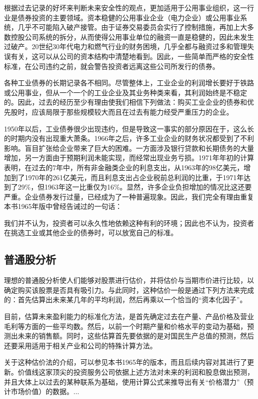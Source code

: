 \documentclass[12pt,oneside]{book}
\begin{document}
根据过去记录的好坏来判断未来安全性的观点，更加适用于公用事业组织，这一行业是债券投资的主要领域。资本稳健的公用事业企业（电力企业）或公用事业系统，几乎不可能陷入破产接管。由于证券交易委员会实行了控制措施，再加上大多数控股公司系统的拆分，从而使得公用事业单位的融资一直是稳健的，因此未发生过破产。20世纪30年代电力和燃气行业的财务困境，几乎全都与融资过多和管理失误有关，这可以从公司的资本结构中清楚地看到。因此，一些简单而严格的安全性标准，在公司违约之前，就会警告投资者远离这些公司所发行的债券。

各种工业债券的长期记录各不相同。尽管整体上，工业企业的利润增长要好于铁路或公用事业，但从一个一个的工业企业及其业务种类来看，其利润始终是不稳定的。因此，过去的经历至少有理由使我们相信下列做法：购买工业企业的债券和优先股时，应该局限于那些规模较大而且在过去有能力经受严重压力的企业。

1950年以后，工业债券很少出现违约，但是导致这一事实的部分原因在于，这么长的时期内没有出现重大萧条。1966年之后，许多工业企业的财务状况都受到了不利影响。盲目扩张给企业带来了巨大的困难。一方面涉及银行贷款和长期债务的大量增加，另一方面由于预期利润未能实现，而经常出现业务亏损。1971年年初的计算表明，在过去的7年中，所有非金融类企业的利息支出，从1963年的98亿美元，增加到了1970年的261亿美元，而且利息支出占企业税前总利润的比重，于1971年达到了29\%，但1963年这一比重仅为16\%。显然，许多企业负担增加的情况比这还要严重。企业债券发行过量，已经成为了一种普遍现象。因此，我们完全有理由重复本书1965年版中曾经告诫过的一句话：

我们并不认为，投资者可以永久性地依赖这种有利的环境；因此也不认为，投资者在挑选工业或其他企业的债券时，可以放宽自己的标准。

\subsection{普通股分析}
理想的普通股分析使人们能够对股票进行估价，并将估价与当期市价进行比较，以确定购买该股票是否具有吸引力。与此同时，这种估价一般是通过下列方法来完成的：首先估算出未来某几年的平均利润，然后再乘以一个恰当的“资本化因子”。

目前，估算未来盈利能力的标准化方法，是首先确定过去在产量、产品价格及营业毛利等方面的一些平均数。然后，以前一个时期产量和价格水平的变动为基础，预测出未来的销售额。同时，这些估算首先要依据的是对国民生产总值的预测，然后还要采用适用于相关产业和公司的特殊计算方法。

关于这种估价法的介绍，可以参见本书1965年的版本，而且后续内容对其进行了更新。价值线这家顶尖的投资服务公司依据上述方法对未来的利润和股息做出预测，并且大体上以过去的某种联系为基础，使用计算公式来推导出有关“价格潜力”（预计市场价值）的数据。...
\end{document}
